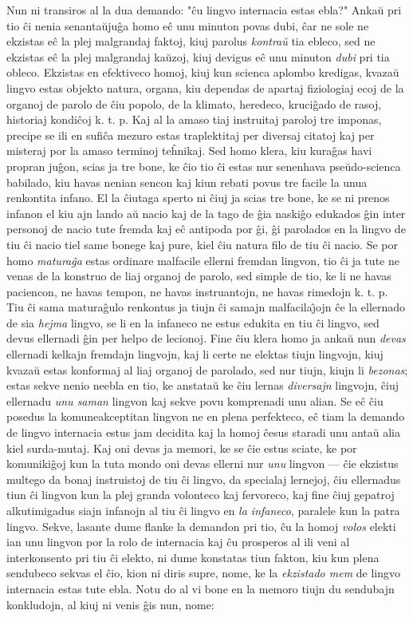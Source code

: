    Nun ni transiros al la dua demando: "\^cu lingvo internacia estas
ebla?" Anka\u u pri tio \^ci nenia senanta\u uju\^ga homo e\^c unu
minuton povas dubi, \^car ne sole ne ekzistas e\^c la plej
malgrandaj faktoj, kiuj parolus {\sl kontra\u u} tia ebleco, sed ne
ekzistas e\^c la plej malgrandaj ka\u uzoj, kiuj devigus e\^c unu
minuton {\sl dubi} pri tia obleco. Ekzistas en efektiveco homoj,
kiuj kun scienca aplombo kredigas, kvaza\u u lingvo estas objekto
natura, organa, kiu dependas de apartaj fiziologiaj ecoj de la
organoj de parolo de \^ciu popolo, de la klimato, heredeco,
kruci\^gado de rasoj, historiaj kondi\^coj k. t. p. Kaj al la amaso
tiaj instruitaj paroloj tre imponas, precipe se ili en sufi\^ca
mezuro estas traplektitaj per diversaj citatoj kaj per misteraj por
la amaso terminoj te\^hnikaj. Sed homo klera, kiu kura\^gas havi
propran ju\^gon, scias ja tre bone, ke \^cio tio \^ci estas nur
senenhava pse\u udo-scienca babilado, kiu havas nenian sencon kaj
kiun rebati povus tre facile la unua renkontita infano. El la
\^ciutaga sperto ni \^ciuj ja scias tre bone, ke se ni prenos
infanon el kiu ajn lando a\u u nacio kaj de la tago de \^gia
naski\^go edukados \^gin inter personoj de nacio tute fremda kaj
e\^c antipoda por \^gi, \^gi parolados en la lingvo de tiu \^ci
nacio tiel same bonege kaj pure, kiel \^ciu natura filo de tiu \^ci
nacio. Se por homo {\sl matura\^ga} estas ordinare malfacile ellerni
fremdan lingvon, tio \^ci ja tute ne venas de la konstruo de liaj
organoj de parolo, sed simple de tio, ke li ne havas paciencon, ne
havas tempon, ne havas instruantojn, ne havas rimedojn k. t. p. Tiu
\^ci sama matura\^gulo renkontus ja tiujn \^ci samajn
malfacila\^{\j}ojn \^ce la ellernado de sia {\sl hejma} lingvo, se
li en la infaneco ne estus edukita en tiu \^ci lingvo, sed devus
ellernadi \^gin per helpo de lecionoj. Fine \^ciu klera homo ja
anka\u u nun {\sl devas} ellernadi kelkajn fremdajn lingvojn, kaj li
certe ne elektas tiujn lingvojn, kiuj kvaza\u u estas konformaj al
liaj organoj de parolado, sed nur tiujn, kiujn li {\sl bezonas};
estas sekve nenio neebla en tio, ke anstata\u u ke \^ciu lernas {\sl
diversajn} lingvojn, \^ciuj ellernadu {\sl unu saman} lingvon kaj
sekve povu komprenadi unu alian. Se e\^c \^ciu posedus la
komuneakceptitan lingvon ne en plena perfekteco, e\^c tiam la
demando de lingvo internacia estus jam decidita kaj la homoj \^cesus
staradi unu anta\u u alia kiel surda-mutaj. Kaj oni devas ja memori,
ke se \^cie estus sciate, ke por komuniki\^goj kun la tuta mondo oni
devas ellerni nur {\sl unu} lingvon --- \^cie ekzistus multego da
bonaj instruistoj de tiu \^ci lingvo, da specialaj lernejoj, \^ciu
ellernadus tiun \^ci lingvon kun la plej granda volonteco kaj
fervoreco, kaj fine \^ciuj gepatroj alkutimigadus siajn infanojn al
tiu \^ci lingvo en {\sl la infaneco}, paralele kun la patra lingvo.
Sekve, lasante dume flanke la demandon pri tio, \^cu la homoj {\sl
volos} elekti ian unu lingvon por la rolo de internacia kaj \^cu
prosperos al ili veni al interkonsento pri tiu \^ci elekto, ni dume
konstatas tiun fakton, kiu kun plena sendubeco sekvas el \^cio, kion
ni diris supre, nome, ke la {\sl ekzistado mem} de lingvo internacia
estas tute ebla. Notu do al vi bone en la memoro tiujn du sendubajn
konkludojn, al kiuj ni venis \^gis nun, nome:

